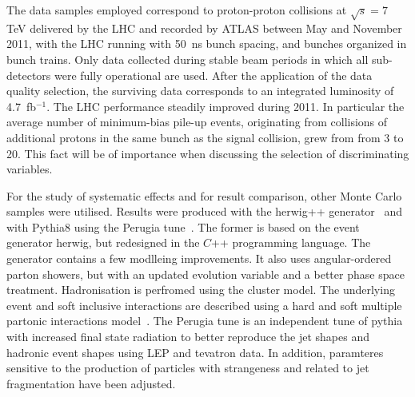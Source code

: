 The data samples employed correspond to proton-proton collisions at $\sqrt{s}=7$ TeV delivered by the LHC and recorded by ATLAS between May and November 2011, with the LHC running with 50~ns bunch spacing, and bunches organized in bunch trains. Only data collected during stable beam periods in which all sub-detectors were fully operational are used.  After the application of the data quality selection, %
the surviving data corresponds to an integrated luminosity of 4.7~fb$^{-1}$. The LHC performance steadily improved during 2011. In particular  the average number of minimum-bias pile-up events, originating from collisions of additional protons in the same bunch as the signal collision, grew from from 3 to 20. This fact will be of importance when discussing the selection of discriminating variables.  

For the study of systematic effects and for result comparison, other Monte Carlo samples were utilised. Results were produced with the {\sc herwig}++  generator~\cite{Herwig} and with {\sc Pythia8} using the Perugia tune~\cite{Perugia}. The former is based on the event generator {\sc herwig}, but redesigned in the $C$++ programming language. The generator contains a few modlleing improvements. It also uses angular-ordered parton showers, but with an updated evolution variable and a better phase space treatment. Hadronisation is perfromed using the cluster model. The underlying event and soft inclusive interactions are described using a hard and soft multiple partonic interactions model~\cite{Bahr:2008dy}. The Perugia tune is an independent tune of {\sc pythia} with increased final state radiation to better reproduce the jet shapes and hadronic event shapes using LEP and {\sc tevatron} data. In addition, paramteres sensitive to the production of particles with strangeness and related to jet fragmentation have been adjusted.




